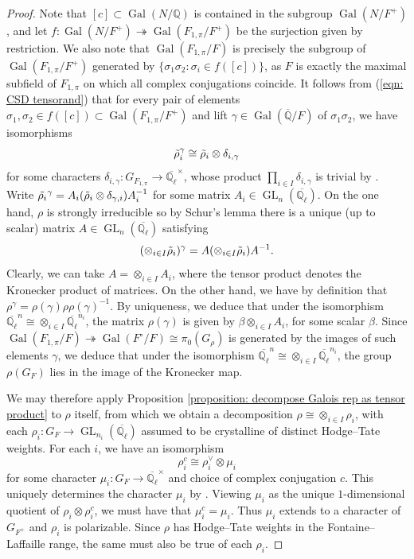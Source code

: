 \documentclass{amsart}
\theoremstyle{definition}
\numberwithin{equation}{section} %
\newcommand{\GL}{\operatorname{GL}}
\newcommand{\Qlbar}{\ensuremath{\overline{\mathbb{Q}_\ell}}}
\newcommand{\Gal}{\operatorname{Gal}}
\newcommand{\bb}[1]{\mathbb{#1}}
\begin{document}
\begin{proof}
Note that \( [c]\subset\Gal(N/\bb{Q}) \) is contained in the subgroup \( \Gal(N/F^+) \), and let $f: \Gal(N/F^+) \twoheadrightarrow \Gal(F_{1,\pi}/F^+)$ be the surjection given by restriction. We also note that \( \Gal(F_{1,\pi}/F) \) is precisely the subgroup of \( \Gal(F_{1,\pi}/F^+) \) generated by \( \{\sigma_1 \sigma_2: \sigma_i \in f([c]) \} \), as $F$ is exactly the maximal subfield of $F_{1,\pi}$ on which all complex conjugations coincide.
It follows from (\ref{eqn: CSD tensorand}) that for every pair of elements $\sigma_1, \sigma_2 \in f([c]) \subset \Gal(F_{1,\pi}/F^+)$ and lift $\gamma \in \Gal(\overline{\bb{Q}}/F)$ of $\sigma_1 \sigma_2$, we have isomorphisms
\[
\Tilde{\rho}_i^{\gamma} \cong \Tilde{\rho}_i \otimes \delta_{i,\gamma}
\]
for some characters $\delta_{i,\gamma}: G_{F_{1,\pi}} \to \Qlbar^\times$, whose product $\prod_{i \in I} \delta_{i,\gamma}$ is trivial by \cite[Lemma 4.8 (1)]{kret2022galois}.
Write $\Tilde{\rho_i}^\gamma = A_i (\Tilde{\rho}_i \otimes \delta_{\gamma,i}) A_i^{-1}$ for some matrix $A_i \in \GL_n(\Qlbar)$.
On the one hand, $\rho$ is strongly irreducible so by Schur's lemma there is a unique (up to scalar) matrix $A \in \GL_n(\Qlbar)$ satisfying
\[(\otimes_{i \in I} \Tilde{\rho}_i)^\gamma = A (\otimes_{i \in I} \Tilde{\rho}_i) A^{-1}.\]
Clearly, we can take $A = \otimes_{i \in I} A_i$, where the tensor product denotes the Kronecker product of matrices.
On the other hand, we have by definition that $\rho^\gamma = \rho(\gamma) \rho \rho(\gamma)^{-1}$.
By uniqueness, we deduce that under the isomorphism $\Qlbar^n \cong \otimes_{i \in I} \Qlbar^{n_i}$, the matrix $\rho(\gamma)$ is given by $\beta \otimes_{i \in I} A_i$, for some scalar $\beta$.
Since $\Gal(F_{1,\pi}/F) \twoheadrightarrow \Gal(F^\circ/F) \cong \pi_0(G_\rho)$ is generated by the images of such elements $\gamma$, we deduce that under the isomorphism $\Qlbar^n \cong \otimes_{i \in I} \Qlbar^{n_i}$, the group $\rho(G_F)$ lies in the image of the Kronecker map.

We may therefore apply Proposition \ref{proposition: decompose Galois rep as tensor product} to $\rho$ itself, from which we obtain a decomposition $\rho \cong \otimes_{i \in I} \rho_i$, with each $\rho_i: G_F \to \GL_{n_i}(\Qlbar)$ assumed to be crystalline of distinct Hodge--Tate weights.
For each $i$,
we have an isomorphism
\[
\rho_i^c \cong \rho_i^\vee \otimes \mu_i
\]
for some character $\mu_i: G_{F} \to \Qlbar^\times$ and choice of complex conjugation $c$.
This uniquely determines the character $\mu_i$ by \cite[Lemma 3.2.8]{CEG22}.
Viewing $\mu_i$ as the unique $1$-dimensional quotient of $\rho_i \otimes \rho_i^c$, we must have that $\mu_i^c = \mu_i$.
Thus $\mu_i$ extends to a character of $G_{F^+}$ and $\rho_i$ is polarizable.
Since $\rho$ has Hodge--Tate weights in the Fontaine--Laffaille range, the same must also be true of each $\rho_i$.
\end{proof}
\end{document}
